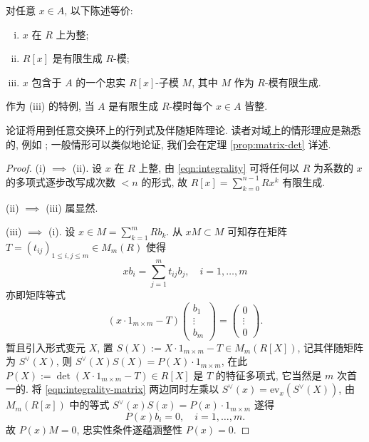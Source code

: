 \begin{theorem}\label{prop:integrality-finiteness}
	对任意 $x \in A$, 以下陈述等价:
	\begin{enumerate}[(i)]
		\item $x$ 在 $R$ 上为整;
		\item $R[x]$ 是有限生成 $R$-模;
		\item $x$ 包含于 $A$ 的一个忠实 $R[x]$-子模 $M$, 其中 $M$ 作为 $R$-模有限生成.
	\end{enumerate}
	作为 (iii) 的特例, 当 $A$ 是有限生成 $R$-模时每个 $x \in A$ 皆整.
\end{theorem}
论证将用到任意交换环上的行列式及伴随矩阵理论. 读者对域上的情形理应是熟悉的, 例如 \cite[命题 4.11]{Xi16}; 一般情形可以类似地论证, 我们会在定理 \ref{prop:matrix-det} 详述.
\begin{proof}
	(i) $\implies$ (ii). 设 $x$ 在 $R$ 上整, 由 \eqref{eqn:integrality} 可将任何以 $R$ 为系数的 $x$ 的多项式逐步改写成次数 $< n$ 的形式, 故 $R[x] = \sum_{k=0}^{n-1} R x^k$ 有限生成.
	
	(ii) $\implies$ (iii) 属显然.
	
	(iii) $\implies$ (i). 设 $x \in M = \sum_{k=1}^m R b_k$. 从 $xM \subset M$ 可知存在矩阵 $T = (t_{ij})_{1 \leq i,j \leq m} \in M_m(R)$ 使得
	\[ x b_i = \sum_{j=1}^m t_{ij} b_j , \quad i = 1, \ldots, m \]
	亦即矩阵等式
	\begin{equation}\label{eqn:integrality-matrix}
		( x \cdot 1_{m \times m} - T) \begin{pmatrix} b_1 \\ \vdots \\ b_m \end{pmatrix}  = \begin{pmatrix} 0 \\ \vdots \\ 0 \end{pmatrix}.
	\end{equation}
	暂且引入形式变元 $X$, 置 $S(X) := X \cdot 1_{m \times m} - T \in M_m(R[X])$, 记其伴随矩阵为 $S^\vee(X)$, 则 $S^\vee(X) S(X) = P(X) \cdot 1_{m \times m}$, 在此 $P(X) := \det(X \cdot 1_{m \times m} - T) \in R[X]$ 是 $T$ 的特征多项式, 它当然是 $m$ 次首一的. 将 \eqref{eqn:integrality-matrix} 两边同时左乘以 $S^\vee(x) = \text{ev}_x(S^\vee(X))$, 由 $M_m(R[x])$ 中的等式 $S^\vee(x)S(x) = P(x) \cdot 1_{m \times m}$ 遂得
	\[ P(x) b_i = 0, \quad i=1, \ldots, m. \]
	故 $P(x) M=0$, 忠实性条件遂蕴涵整性 $P(x)=0$.
\end{proof}

